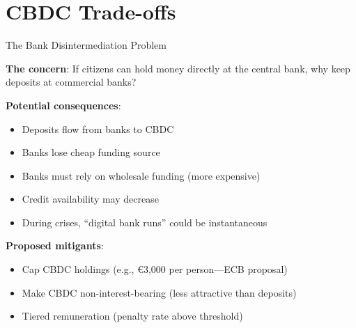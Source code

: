 \documentclass[10pt]{beamer}
\begin{document}
\section{CBDC Trade-offs}

\begin{frame}{The Bank Disintermediation Problem}
  
  \textbf{The concern}: If citizens can hold money directly at the central bank, why keep deposits at commercial banks?
  
  \vspace{1em}
  \textbf{Potential consequences}:
  \begin{itemize}
    \item Deposits flow from banks to CBDC
    \item Banks lose cheap funding source
    \item Banks must rely on wholesale funding (more expensive)
    \item Credit availability may decrease
    \item During crises, ``digital bank runs'' could be instantaneous
  \end{itemize}
  
  \vspace{1em}
  \textbf{Proposed mitigants}:
  \begin{itemize}
    \item Cap CBDC holdings (e.g., €3,000 per person---ECB proposal)
    \item Make CBDC non-interest-bearing (less attractive than deposits)
    \item Tiered remuneration (penalty rate above threshold)
  \end{itemize}
\end{frame}
\end{document}
